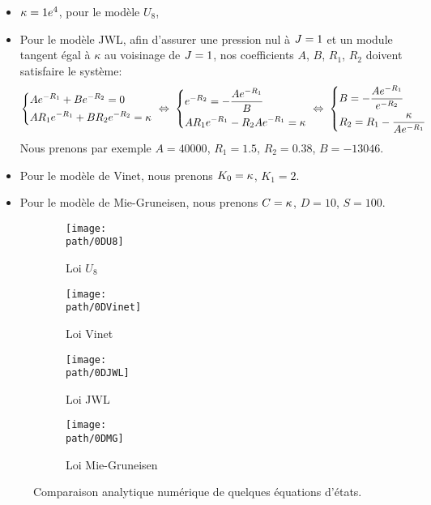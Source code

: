 \documentclass[10pt]{book}
\def\path{./fig}
\begin{document}
\begin{itemize}
\item $\kappa = 1e^{4}$, pour le modèle $U_{8}$,
\item Pour le modèle JWL, afin d'assurer une pression nul à $J=1$ et un module tangent égal à $\kappa$ au voisinage de $J=1$, nos coefficients $A$, $B$, $R_{1}$, $R_{2}$ doivent satisfaire le système:
$$\left\{\begin{aligned}
&Ae^{-R_{1}}+Be^{-R_{2}}=0\\
&AR_{1}e^{-R_{1}}+BR_{2}e^{-R_{2}}=\kappa\\
\end{aligned}\right. \; \Leftrightarrow \; \left\{\begin{aligned}
&e^{-R_{2}}=-\frac{Ae^{-R_{1}}}{B}\\
&AR_{1}e^{-R_{1}}-R_{2}Ae^{-R_{1}}=\kappa\\
\end{aligned}\right.\; \Leftrightarrow \; 
\left\{\begin{aligned}
&B=-\frac{Ae^{-R_{1}}}{e^{-R_{2}}}\\
&R_{2}=R_{1}-\dfrac{\kappa}{Ae^{-R_{1}}}\\
\end{aligned}\right.$$
Nous prenons par exemple $A = 40000$, $R_{1}=1.5$, $R_{2} = 0.38$, $B = -13046$.
\item Pour le modèle de Vinet, nous prenons $K_{0}=\kappa$, $K_{1}=2$.
\item Pour le modèle de Mie-Gruneisen, nous prenons $C=\kappa$, $D=10$, $S=100$.
\end{itemize}
\begin{figure}
\begin{subfigure}[b]{0.49\textwidth}
\centering \texttt{[image: \\path/0DU8]}
\caption{Loi $U_{8}$}
\label{fig:compa_U8}
\end{subfigure}
\begin{subfigure}[b]{0.49\textwidth}
\centering \texttt{[image: \\path/0DVinet]}
\caption{Loi Vinet}
\label{fig:compa_Vinet}
\end{subfigure}
\begin{subfigure}[b]{0.49\textwidth}
\centering \texttt{[image: \\path/0DJWL]}
\caption{Loi JWL}
\label{fig:compa_JWL}
\end{subfigure}
\begin{subfigure}[b]{0.49\textwidth}
\centering \texttt{[image: \\path/0DMG]}
\caption{Loi Mie-Gruneisen}
\label{fig:compa_MG}
\end{subfigure}
\caption{Comparaison analytique numérique de quelques équations d'états.}
\label{fig:compa_eos}
\end{figure}
\FloatBarrier
\end{document}
